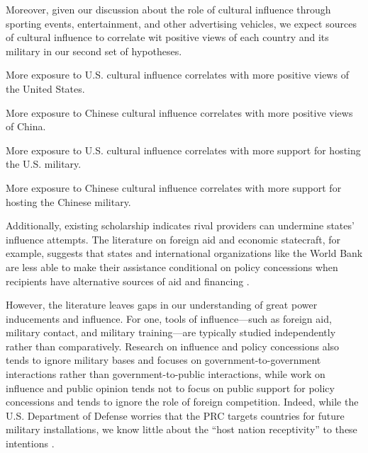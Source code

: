 Moreover, given our discussion about the role of cultural influence through sporting events, entertainment, and other advertising vehicles, we expect sources of cultural influence to correlate wit positive views of each country and its military in our second set of hypotheses.


\begin{subhyp}
	
	\begin{hyp}
		More exposure to U.S. cultural influence correlates with more positive views of the United States.
	\end{hyp}
	
	\begin{hyp}
		More exposure to Chinese cultural influence correlates with more positive views of China.
	\end{hyp}
	
\end{subhyp}

\begin{subhyp}
	
	\begin{hyp}
		More exposure to U.S. cultural influence correlates with more support for hosting the U.S. military.
	\end{hyp}
	
	\begin{hyp}
		More exposure to Chinese cultural influence correlates with more support for hosting the Chinese military.
	\end{hyp}
	
\end{subhyp}

Additionally, existing scholarship indicates rival providers can undermine states' influence attempts. The literature on foreign aid and economic statecraft, for example, suggests that states and international organizations like the World Bank are less able to make their assistance conditional on policy concessions when recipients have alternative sources of aid and financing \cite{dunning2004,bdm2016,woods2008,kastner2021,watkins2022}. %


However, the literature leaves gaps in our understanding of great power inducements and influence. For one, tools of influence—such as foreign aid, military contact, and military training—are typically studied independently rather than comparatively. Research on influence and policy concessions also tends to ignore military bases and focuses on government-to-government interactions rather than government-to-public interactions, while work on influence and public opinion tends not to focus on public support for policy concessions and tends to ignore the role of foreign competition. Indeed, while the U.S. Department of Defense worries that the PRC targets countries for future military installations, we know little about the ``host nation receptivity'' to these intentions \cite{hudson2023}. 

